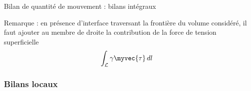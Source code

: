 \begin{frame}{Bilan de quantité de mouvement : bilans intégraux}
\pause

Remarque : en présence d'interface traversant la frontière du volume considéré, il faut ajouter au membre de droite la contribution de la force de tension superficielle
$$
\int_{\mathcal{L}} \gamma \myvec{\tau} \, dl
$$


\end{frame}
\subsubsection{Bilans locaux}
%
%
%
%
%	
%
%
%
%
